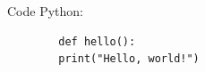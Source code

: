 \documentclass{article}
\begin{document}
	
	Code Python:
	
	\begin{verbatim}
		def hello():
		print("Hello, world!")
	\end{verbatim}
	
\end{document}
